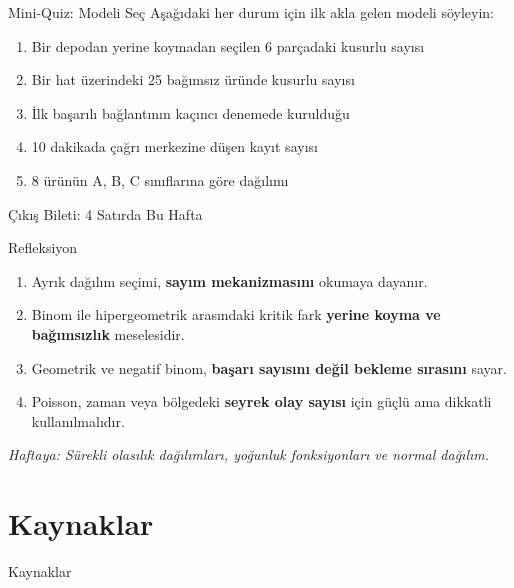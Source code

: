 \documentclass[light]{lutbeamer}
\begin{document}
\begin{frame}[fragile]{Mini-Quiz: Modeli Seç}
    \small
    Aşağıdaki her durum için ilk akla gelen modeli söyleyin:
    \begin{enumerate}[<+->]
        \item Bir depodan yerine koymadan seçilen 6 parçadaki kusurlu sayısı
        \item Bir hat üzerindeki 25 bağımsız üründe kusurlu sayısı
        \item İlk başarılı bağlantının kaçıncı denemede kurulduğu
        \item 10 dakikada çağrı merkezine düşen kayıt sayısı
        \item 8 ürünün A, B, C sınıflarına göre dağılımı
    \end{enumerate}
\end{frame}

\begin{frame}{Çıkış Bileti: 4 Satırda Bu Hafta}
    \begin{block}{Refleksiyon}
        \begin{enumerate}
            \item Ayrık dağılım seçimi, \textbf{sayım mekanizmasını} okumaya dayanır.
            \item Binom ile hipergeometrik arasındaki kritik fark \textbf{yerine koyma ve bağımsızlık} meselesidir.
            \item Geometrik ve negatif binom, \textbf{başarı sayısını değil bekleme sırasını} sayar.
            \item Poisson, zaman veya bölgedeki \textbf{seyrek olay sayısı} için güçlü ama dikkatli kullanılmalıdır.
        \end{enumerate}
    \end{block}

    \vspace{0.3cm}
    \centering
    \textit{Haftaya: Sürekli olasılık dağılımları, yoğunluk fonksiyonları ve normal dağılım.}
\end{frame}

\section{Kaynaklar}
\begin{frame}[allowframebreaks]{Kaynaklar}
    \nocite{*}
    \printbibliography{}
\end{frame}
\end{document}

